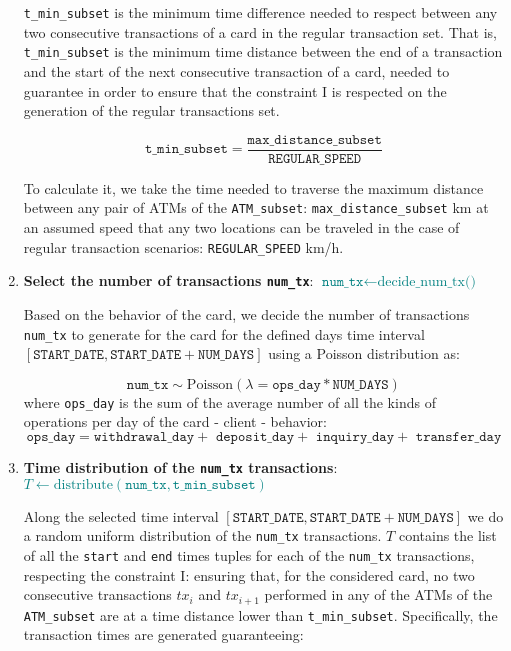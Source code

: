 \begin{enumerate}
    \texttt{t\_min\_subset} is the minimum time difference needed to respect between any two consecutive transactions of a card in the regular transaction set. That is, \texttt{t\_min\_subset} is the minimum time distance between the end of a transaction and the start of the next consecutive transaction of a card, needed to guarantee in order to ensure that the constraint I is respected on the generation of the regular transactions set.
    
    $$\texttt{t\_min\_subset} = \frac{\texttt{max\_distance\_subset}}{\texttt{REGULAR\_SPEED}}$$

    To calculate it, we take the time needed to traverse the maximum distance between any pair of ATMs of the \texttt{ATM\_subset}: \texttt{max\_distance\_subset} km at an assumed speed that any two locations can be traveled in the case of regular transaction scenarios: \texttt{REGULAR\_SPEED} km/h.

    \item \textbf{Select the number of transactions \texttt{num\_tx}}:
    {\footnotesize \textcolor{teal}{$\texttt{num\_tx} \gets \text{decide\_num\_tx()}$}}
    
    Based on the behavior of the card, we decide the number of transactions \texttt{num\_tx} to generate for the card for the defined days time interval $[\texttt{START\_DATE}, \texttt{START\_DATE} + \texttt{NUM\_DAYS}]$ using a Poisson distribution as:

    $$\texttt{num\_tx} \sim \text{Poisson}(\lambda = \texttt{ops\_day} * \texttt{NUM\_DAYS})$$ where \texttt{ops\_day} is the sum of the average number of all the kinds of operations per day of the card - client - behavior: 
    $$\texttt{ops\_day} = \texttt{withdrawal\_day} + \texttt{ deposit\_day} + \texttt{ inquiry\_day} + \texttt{ transfer\_day}$$

    \item \textbf{Time distribution of the \texttt{num\_tx} transactions}: 
     {\footnotesize \textcolor{teal}{$T \gets \text{distribute}(\texttt{num\_tx}, \texttt{t\_min\_subset})$}}
    
    Along the selected time interval $[\texttt{START\_DATE}, \texttt{START\_DATE} + \texttt{NUM\_DAYS}]$ we do a random uniform distribution of the \texttt{num\_tx} transactions. $T$ contains the list of all the \texttt{start} and \texttt{end} times tuples for each of the \texttt{num\_tx} transactions, respecting the constraint I: ensuring that, for the considered card, no two consecutive transactions $tx_i$ and $tx_{i+1}$ performed in any of the ATMs of the \texttt{ATM\_subset} are at a time distance lower than \texttt{t\_min\_subset}. Specifically, the transaction times are generated guaranteeing:


\end{enumerate}
